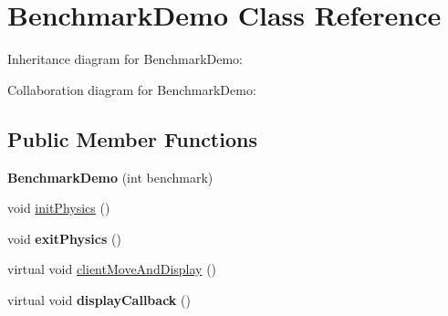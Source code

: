 \hypertarget{class_benchmark_demo}{\section{Benchmark\+Demo Class Reference}
\label{class_benchmark_demo}
}


Inheritance diagram for Benchmark\+Demo\+:


Collaboration diagram for Benchmark\+Demo\+:
\subsection*{Public Member Functions}
\begin{DoxyCompactItemize}
\item 
\hypertarget{class_benchmark_demo_a90bf3e7c9a982ea8bc5c044a62172647}{{\bfseries Benchmark\+Demo} (int benchmark)}\label{class_benchmark_demo_a90bf3e7c9a982ea8bc5c044a62172647}

\item 
void \hyperlink{class_benchmark_demo_ab60cf6560a20b275610fe464690858b3}{init\+Physics} ()
\item 
\hypertarget{class_benchmark_demo_a06ad16cfdbf8e381958d44c4ff848303}{void {\bfseries exit\+Physics} ()}\label{class_benchmark_demo_a06ad16cfdbf8e381958d44c4ff848303}

\item 
virtual void \hyperlink{class_benchmark_demo_a5fe46e3eb255c03c623c643d13634923}{client\+Move\+And\+Display} ()
\item 
\hypertarget{class_benchmark_demo_ae46dd425452ddc290bd884038cd57c58}{virtual void {\bfseries display\+Callback} ()}\label{class_benchmark_demo_ae46dd425452ddc290bd884038cd57c58}

\end{DoxyCompactItemize}


